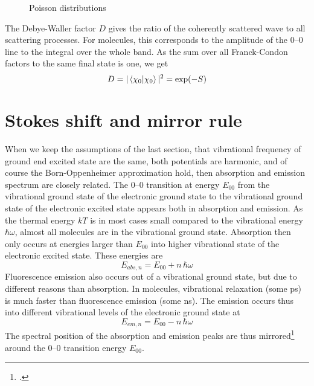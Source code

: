 \begin{figure}
   
  \caption{Poisson distributions}
\end{figure}

The Debye-Waller factor $D$ gives the ratio of the coherently scattered wave to all scattering processes. For molecules, this corresponds to the amplitude of the 0--0 line to the integral over the whole band. As the sum over all Franck-Condon factors to the same final state is one, we get
\begin{equation}
 D =  | \braket{ \chi_0 | \chi_0 } | ^2 = \exp(-S)
\end{equation}


\section{Stokes shift and mirror rule}


When we keep the assumptions of the last section, that vibrational frequency of ground end excited state are the same, both potentials are harmonic, and of course the Born-Oppenheimer approximation hold, then absorption and emission spectrum are closely related. The 0--0 transition at energy $E_{00}$ from the vibrational ground state of the electronic ground state to the vibrational ground state of the electronic excited state appears both in absorption and emission. As the thermal energy $kT$ is in most cases small compared to the vibrational energy $\hbar \omega$, almost all molecules are in the vibrational ground state. Absorption then only occurs at energies larger than $E_{00}$ into higher vibrational state of the electronic excited state. These energies are
\begin{equation}
  E_{abs, n} = E_{00} + n \, \hbar \omega
\end{equation}
Fluorescence emission also occurs out of a vibrational ground state, but due to different reasons than absorption. In molecules, vibrational relaxation  (some ps) is much faster than fluorescence emission (some ns). The emission occurs thus into different vibrational levels of the electronic ground state at
\begin{equation}
  E_{em, n} = E_{00} - n \, \hbar \omega
\end{equation}
The spectral position of the absorption and emission peaks are thus mirrored\footcite[chapter 1.3.2 and 1.3.3]{Lakowicz2010} around the 0--0 transition  energy $E_{00}$.

